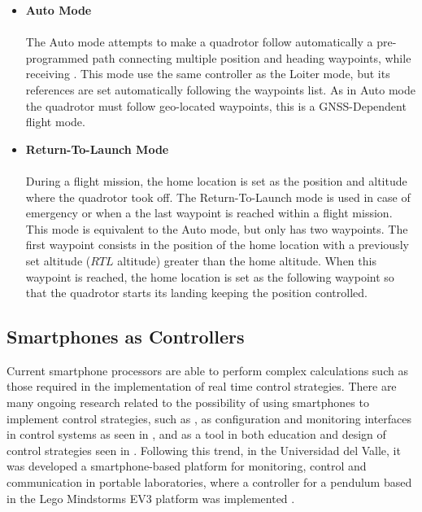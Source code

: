 \begin{itemize}
\item \textbf{Auto Mode}\\\\
The Auto mode attempts to make a quadrotor follow automatically a pre-programmed path connecting multiple position and heading waypoints, while receiving . This mode use the same controller as the Loiter mode, but its references are set automatically following the waypoints list. As in Auto mode the quadrotor must follow geo-located waypoints, this is a GNSS-Dependent flight mode.

\item \textbf{Return-To-Launch Mode}\\\\
During a flight mission, the home location is set as the position and altitude where the quadrotor took off. The Return-To-Launch mode is used in case of emergency or when a the last waypoint is reached within a flight mission. This mode is equivalent to the Auto mode, but only has two waypoints. The first waypoint consists in the position of the home location with a previously set altitude ($RTL$ altitude) greater than the home altitude. When this waypoint is reached, the home location is set as the following waypoint so that the quadrotor starts its landing keeping the position controlled.

\end{itemize}


\subsection{Smartphones as Controllers}
Current smartphone processors are able to perform complex calculations such as those required in the implementation of real time control strategies. There are many ongoing research related to the possibility of using smartphones to implement control strategies, such as \cite{Drumea2013a}, as configuration and monitoring interfaces in control systems as seen in \cite{Lin2014a,Truong2012a}, and as a tool in both education and design of control strategies seen in \cite{Aristizabal2014a,WuWu2013a}. Following this trend, in the Universidad del Valle, it was developed a smartphone-based platform for monitoring, control and communication in portable laboratories, where a controller for a pendulum based in the Lego Mindstorms EV3 platform was implemented \cite {GarciaTellez2015}.
\\\\

